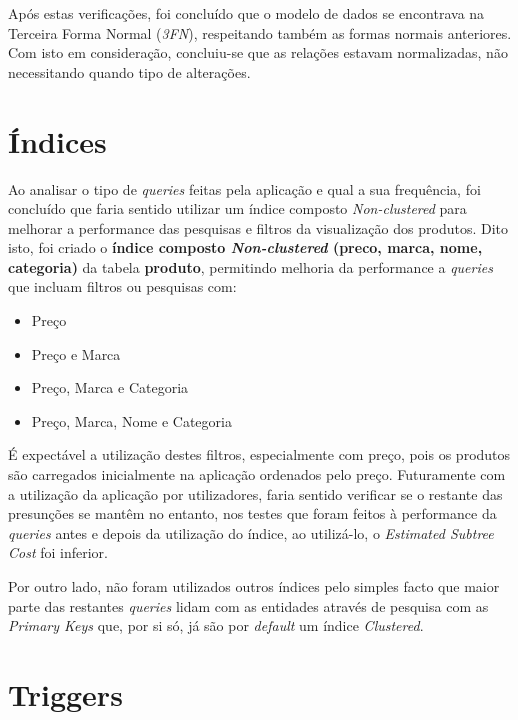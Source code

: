 \documentclass[10pt,portuguese]{article}
\begin{document}
\par Após estas verificações, foi concluído que o modelo de dados se encontrava na Terceira Forma Normal (\textit{3FN}), respeitando também as formas normais anteriores. Com isto em consideração, concluiu-se que as relações estavam normalizadas, não necessitando quando tipo de alterações.

\section{Índices}

\par Ao analisar o tipo de \textit{queries} feitas pela aplicação e qual a sua frequência, foi concluído que faria sentido utilizar um índice composto \textit{Non-clustered} para melhorar a performance das pesquisas e filtros da visualização dos produtos. Dito isto, foi criado o \textbf{índice composto \textit{Non-clustered} (preco, marca, nome, categoria)} da tabela \textbf{produto}, permitindo melhoria da performance a \textit{queries} que incluam filtros ou pesquisas com:
\begin{itemize}
    \item Preço 
    \item Preço e Marca
    \item Preço, Marca e Categoria
    \item Preço, Marca, Nome e Categoria
\end{itemize}

\par É expectável a utilização destes filtros, especialmente com preço, pois os produtos são carregados inicialmente na aplicação ordenados pelo preço. Futuramente com a utilização da aplicação por utilizadores, faria sentido verificar se o restante das presunções se mantêm no entanto, nos testes que foram feitos à performance da \textit{queries} antes e depois da utilização do índice, ao utilizá-lo, o \textit{Estimated Subtree Cost} foi inferior.

\par Por outro lado, não foram utilizados outros índices pelo simples facto que maior parte das restantes \textit{queries} lidam com as entidades através de pesquisa com as \textit{Primary Keys} que, por si só, já são por \textit{default} um índice \textit{Clustered}.

\clearpage

\section{Triggers}
\end{document}
